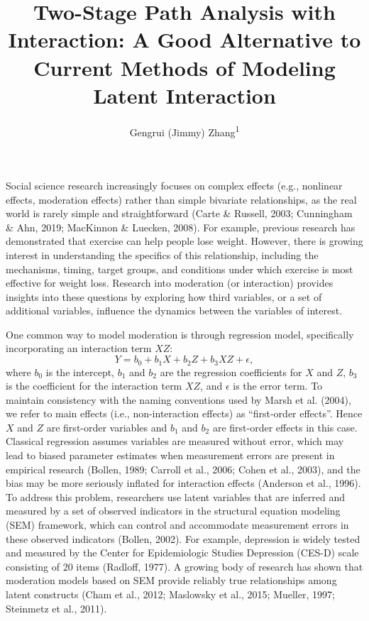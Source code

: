 \documentclass[
  man]{apa6}
\title{Two-Stage Path Analysis with Interaction: A Good Alternative to Current Methods of Modeling Latent Interaction}
\author{Gengrui (Jimmy) Zhang\textsuperscript{1}}
\date{}
\affiliation{\vspace{0.5cm}\textsuperscript{1} University of Southhern California}
\begin{document}
\maketitle

Social science research increasingly focuses on complex effects (e.g., nonlinear effects, moderation effects) rather than simple bivariate relationships, as the real world is rarely simple and straightforward (Carte \& Russell, 2003; Cunningham \& Ahn, 2019; MacKinnon \& Luecken, 2008). For example, previous research has demonstrated that exercise can help people lose weight. However, there is growing interest in understanding the specifics of this relationship, including the mechanisms, timing, target groups, and conditions under which exercise is most effective for weight loss. Research into moderation (or interaction) provides insights into these questions by exploring how third variables, or a set of additional variables, influence the dynamics between the variables of interest.

One common way to model moderation is through regression model, specifically incorporating an interaction term \(XZ\):
\begin{equation}
Y = b_{0} + b_{1}X + b_{2}Z + b_{3}XZ + \epsilon,
\end{equation}
where \(b_{0}\) is the intercept, \(b_{1}\) and \(b_{2}\) are the regression coefficients for \(X\) and \(Z\), \(b_{3}\) is the coefficient for the interaction term \(XZ\), and \(\epsilon\) is the error term. To maintain consistency with the naming conventions used by Marsh et al. (2004), we refer to main effects (i.e., non-interaction effects) as ``first-order effects''. Hence \(X\) and \(Z\) are first-order variables and \(b_{1}\) and \(b_{2}\) are first-order effects in this case. Classical regression assumes variables are measured without error, which may lead to biased parameter estimates when measurement errors are present in empirical research (Bollen, 1989; Carroll et al., 2006; Cohen et al., 2003), and the bias may be more seriously inflated for interaction effects (Anderson et al., 1996). To address this problem, researchers use latent variables that are inferred and measured by a set of observed indicators in the structural equation modeling (SEM) framework, which can control and accommodate measurement errors in these observed indicators (Bollen, 2002). For example, depression is widely tested and measured by the Center for Epidemiologic Studies Depression (CES-D) scale consisting of 20 items (Radloff, 1977). A growing body of research has shown that moderation models based on SEM provide reliably true relationships among latent constructs (Cham et al., 2012; Maslowsky et al., 2015; Mueller, 1997; Steinmetz et al., 2011).
\end{document}
